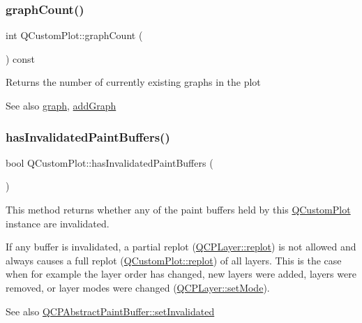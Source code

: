 \subsubsection{\texorpdfstring{graphCount()}{graphCount()}}
{\footnotesize\ttfamily int Q\+Custom\+Plot\+::graph\+Count (\begin{DoxyParamCaption}{ }\end{DoxyParamCaption}) const}

Returns the number of currently existing graphs in the plot

\begin{DoxySeeAlso}{See also}
\mbox{\hyperlink{class_q_custom_plot_a6ecae130f684b25276fb47bd3a5875c6}{graph}}, \mbox{\hyperlink{class_q_custom_plot_a6fb2873d35a8a8089842d81a70a54167}{add\+Graph}} 
\end{DoxySeeAlso}
\mbox{\label{class_q_custom_plot_ad452b582348c8e99462d83fe1cd0279b}} 
\subsubsection{\texorpdfstring{hasInvalidatedPaintBuffers()}{hasInvalidatedPaintBuffers()}}
{\footnotesize\ttfamily bool Q\+Custom\+Plot\+::has\+Invalidated\+Paint\+Buffers (\begin{DoxyParamCaption}{ }\end{DoxyParamCaption})\hspace{0.3cm}{\ttfamily [protected]}}

This method returns whether any of the paint buffers held by this \mbox{\hyperlink{class_q_custom_plot}{Q\+Custom\+Plot}} instance are invalidated.

If any buffer is invalidated, a partial replot (\mbox{\hyperlink{class_q_c_p_layer_adefd53b6db02f470151c416f42e37180}{Q\+C\+P\+Layer\+::replot}}) is not allowed and always causes a full replot (\mbox{\hyperlink{class_q_custom_plot_aa4bfe7d70dbe67e81d877819b75ab9af}{Q\+Custom\+Plot\+::replot}}) of all layers. This is the case when for example the layer order has changed, new layers were added, layers were removed, or layer modes were changed (\mbox{\hyperlink{class_q_c_p_layer_a938d57b04f4e4c23cedf1711f983919b}{Q\+C\+P\+Layer\+::set\+Mode}}).

\begin{DoxySeeAlso}{See also}
\mbox{\hyperlink{class_q_c_p_abstract_paint_buffer_ae4c7dc70dfc66be2879ce297b2b3d67f}{Q\+C\+P\+Abstract\+Paint\+Buffer\+::set\+Invalidated}} 
\end{DoxySeeAlso}
\mbox{\label{class_q_custom_plot_af0b57f35646079f93fa6161a65b36109}} 
